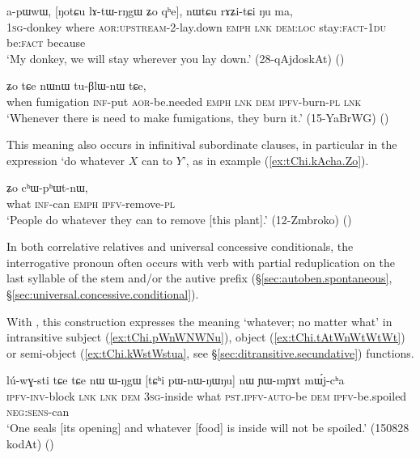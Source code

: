 \begin{exe}
\ex \label{ex:NotCu.lAtWrNgW}
\gll a-pɯwɯ, [ŋotɕu lɤ-tɯ-rŋgɯ ʑo qʰe], nɯtɕu rɤʑi-tɕi ŋu ma, \\
\textsc{1sg}-donkey where \textsc{aor}:\textsc{upstream}-2-lay.down \textsc{emph} \textsc{lnk} \textsc{dem}:\textsc{loc} stay:\textsc{fact}-\textsc{1du} be:\textsc{fact} because \\
\glt `My donkey, we will stay wherever you lay down.' (28-qAjdoskAt)
()
\end{exe}  
 
\begin{exe}
\ex \label{ex:thAjtCu.fsaN}
 ʑo tɕe nɯnɯ tu-βlɯ-nɯ tɕe, \\
when fumigation \textsc{inf}-put \textsc{aor}-be.needed \textsc{emph} \textsc{lnk} \textsc{dem} \textsc{ipfv}-burn-\textsc{pl} \textsc{lnk} \\
\glt `Whenever there is need to make fumigations, they burn it.' (15-YaBrWG)
()
\end{exe}  

This meaning also occurs in infinitival subordinate clauses, in particular in the expression  `do whatever $X$ can to $Y$', as in example (\ref{ex:tChi.kAcha.Zo}).

\begin{exe}
\ex \label{ex:tChi.kAcha.Zo}
 ʑo cʰɯ-pʰɯt-nɯ, \\
what \textsc{inf}-can \textsc{emph} \textsc{ipfv}-remove-\textsc{pl} \\
\glt `People do whatever they can to remove [this plant].' (12-Zmbroko) ()
\end{exe}

In both correlative relatives and universal concessive conditionals, the interrogative pronoun often occurs with verb with partial reduplication on the last syllable of the stem and/or the autive  prefix (§\ref{sec:autoben.spontaneous}, §\ref{sec:universal.concessive.conditional}).

With , this construction expresses the meaning `whatever; no matter what' in intransitive subject (\ref{ex:tChi.pWnWNWNu}), object (\ref{ex:tChi.tAtWnWtWtWt}) or semi-object (\ref{ex:tChi.kWstWstua}, see §\ref{sec:ditransitive.secundative}) functions.

\begin{exe}
\ex \label{ex:tChi.pWnWNWNu}
\gll lú-wɣ-sti tɕe tɕe nɯ ɯ-ŋgɯ [tɕʰi pɯ-nɯ-ŋɯ\redp{}ŋu] nɯ ɲɯ-mɲɤt mɯ́j-cʰa \\
\textsc{ipfv}-\textsc{inv}-block \textsc{lnk} \textsc{lnk} \textsc{dem} \textsc{3sg}-inside what \textsc{pst}.\textsc{ipfv}-\textsc{auto}-be \textsc{dem} \textsc{ipfv}-be.spoiled \textsc{neg}:\textsc{sens}-can \\
\glt `One seals [its opening] and whatever [food] is inside will not be spoiled.' (150828 kodAt)
()
\end{exe}  

